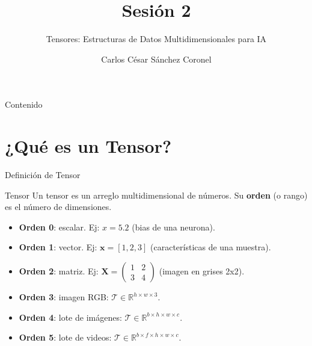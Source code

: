 \documentclass[aspectratio=169, 10pt, xcolor=table]{beamer}
\title[SESI\'ON 2 CÁLCULO]{\textbf{Sesi\'on 2}}
\subtitle{Tensores: Estructuras de Datos Multidimensionales para IA}
\author[Prof. C. S\'anchez]{Carlos C\'esar S\'anchez Coronel}
\institute{\textbf{CÁLCULO Y ÁLGEBRA LINEAL PARA IA}}
\date{}
\begin{document}
\begin{frame}
    \titlepage
\end{frame}

\begin{frame}{Contenido}
    \tableofcontents
\end{frame}

\section{¿Qu\'e es un Tensor?}

\begin{frame}{Definici\'on de Tensor}
    \begin{block}{Tensor}
        Un tensor es un arreglo multidimensional de números. Su \textbf{orden} (o rango) es el número de dimensiones.
    \end{block}
    \begin{itemize}
        \item \textbf{Orden 0}: escalar. Ej: $x = 5.2$ (bias de una neurona).
        \item \textbf{Orden 1}: vector. Ej: $\mathbf{x} = [1,2,3]$ (características de una muestra).
        \item \textbf{Orden 2}: matriz. Ej: $\mathbf{X} = \begin{pmatrix}1&2\\3&4\end{pmatrix}$ (imagen en grises 2x2).
        \item \textbf{Orden 3}: imagen RGB: $\mathcal{T} \in \mathbb{R}^{h \times w \times 3}$.
        \item \textbf{Orden 4}: lote de imágenes: $\mathcal{T} \in \mathbb{R}^{b \times h \times w \times c}$.
        \item \textbf{Orden 5}: lote de videos: $\mathcal{T} \in \mathbb{R}^{b \times f \times h \times w \times c}$.
    \end{itemize}
\end{frame}
\end{document}
